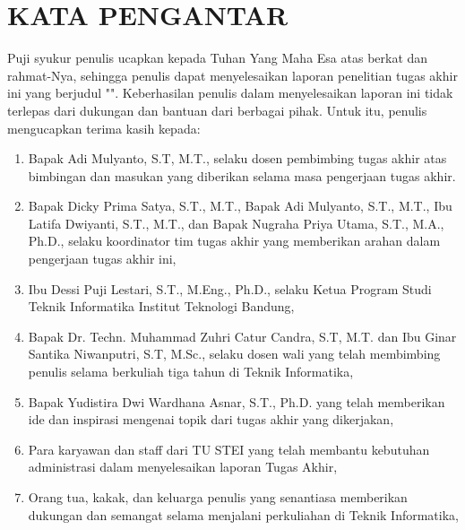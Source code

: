 \chapter*{\MakeUppercase{Kata Pengantar}}

Puji syukur penulis ucapkan kepada Tuhan Yang Maha Esa atas berkat dan rahmat-Nya, sehingga penulis dapat menyelesaikan laporan penelitian tugas akhir ini yang berjudul "{\thetitle}". Keberhasilan penulis dalam menyelesaikan laporan ini tidak terlepas dari dukungan dan bantuan dari berbagai pihak. Untuk itu, penulis mengucapkan terima kasih kepada:

\begin{enumerate}
  \item Bapak Adi Mulyanto, S.T, M.T., selaku dosen pembimbing tugas akhir atas bimbingan dan masukan yang diberikan selama masa pengerjaan tugas akhir.
   
   
  \item Bapak Dicky Prima Satya, S.T., M.T., Bapak Adi Mulyanto, S.T., M.T., Ibu Latifa Dwiyanti, S.T., M.T., dan Bapak Nugraha Priya Utama, S.T., M.A., Ph.D., selaku koordinator tim tugas akhir yang memberikan arahan dalam pengerjaan tugas akhir ini,

  \item Ibu Dessi Puji Lestari, S.T., M.Eng., Ph.D., selaku Ketua Program Studi Teknik Informatika Institut Teknologi Bandung,
   
  \item Bapak Dr. Techn. Muhammad Zuhri Catur Candra, S.T, M.T. dan Ibu Ginar Santika Niwanputri, S.T, M.Sc., selaku dosen wali yang telah membimbing penulis selama berkuliah tiga tahun di Teknik Informatika,
  
  \item Bapak Yudistira Dwi Wardhana Asnar, S.T., Ph.D. yang telah memberikan ide dan inspirasi mengenai topik dari tugas akhir yang dikerjakan, 
  
  \item Para karyawan dan staff dari TU STEI yang telah membantu kebutuhan administrasi dalam menyelesaikan laporan Tugas Akhir,
  
  \item Orang tua, kakak, dan keluarga penulis yang senantiasa memberikan dukungan dan semangat selama menjalani perkuliahan di Teknik Informatika,


\end{enumerate}
